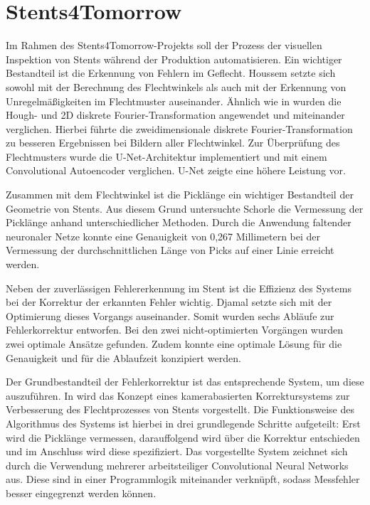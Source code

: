 \section{Stents4Tomorrow}
Im Rahmen des Stents4Tomorrow-Projekts \cite{flechtmaschine} soll der Prozess der visuellen Inspektion von Stents während der Produktion automatisieren. Ein wichtiger Bestandteil ist die Erkennung von Fehlern im Geflecht. Houssem \cite{houssem} setzte sich sowohl mit der Berechnung des Flechtwinkels als auch mit der Erkennung von Unregelmäßigkeiten im Flechtmuster auseinander. Ähnlich wie in \cite{hunt2019machine} wurden die Hough- und 2D diskrete Fourier-Transformation angewendet und miteinander verglichen. Hierbei führte die zweidimensionale diskrete Fourier-Transformation zu besseren Ergebnissen bei Bildern aller Flechtwinkel. Zur Überprüfung des Flechtmusters wurde die U-Net-Architektur implementiert und mit einem Convolutional Autoencoder verglichen. U-Net zeigte eine höhere Leistung vor. \cite{houssem}

\mypar Zusammen mit dem Flechtwinkel ist die Picklänge ein wichtiger Bestandteil der Geometrie von Stents. Aus diesem Grund untersuchte Schorle \cite{felix} die Vermessung der Picklänge anhand unterschiedlicher Methoden. Durch die Anwendung faltender neuronaler Netze konnte eine Genauigkeit von 0,267 Millimetern bei der Vermessung der durchschnittlichen Länge von Picks auf einer Linie erreicht werden. \cite{felix}

\mypar Neben der zuverlässigen Fehlererkennung im Stent ist die Effizienz des Systems bei der Korrektur der erkannten Fehler wichtig. Djamal \cite{aulia} setzte sich mit der Optimierung dieses Vorgangs auseinander. Somit wurden sechs Abläufe zur Fehlerkorrektur entworfen. Bei den zwei nicht-optimierten Vorgängen wurden zwei optimale Ansätze gefunden. Zudem konnte eine optimale Lösung für die Genauigkeit und für die Ablaufzeit konzipiert werden. \cite{aulia}

\mypar Der Grundbestandteil der Fehlerkorrektur ist das entsprechende System, um diese auszuführen. In \cite{valentin} wird das Konzept eines kamerabasierten Korrektursystems zur Verbesserung des Flechtprozesses von Stents vorgestellt. Die Funktionsweise des Algorithmus des Systems ist hierbei in drei grundlegende Schritte aufgeteilt: Erst wird die Picklänge vermessen, darauffolgend wird über die Korrektur entschieden und im Anschluss wird diese spezifiziert. Das vorgestellte System zeichnet sich durch die Verwendung mehrerer arbeitsteiliger Convolutional Neural Networks aus. Diese sind in einer Programmlogik miteinander verknüpft, sodass Messfehler besser eingegrenzt werden können. \cite{valentin}